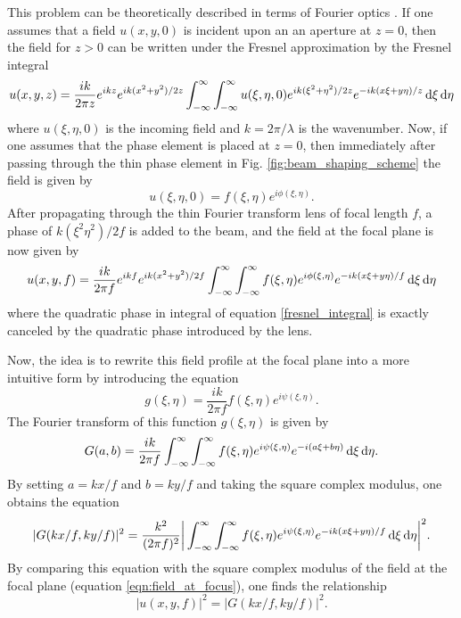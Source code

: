 This problem can be theoretically described in terms of Fourier optics \cite{dickeyLaserBeamShaping2000, romeroMathematicalAspectsLaser2010, goodmanIntroductionFourierOptics2005}.  If one assumes that a field $u(x,y,0)$ is incident upon an an aperture at $z=0$, then the field for $z>0$ can be written under the Fresnel approximation by the Fresnel integral
\begin{equation}
\label{fresnel_integral}
	u(x,y,z)=\frac{i k}{2\pi z}e^{i k z}e^{i k (x^2+y^2)/2z}\int_{-\infty}^{\infty}\int_{-\infty}^{\infty}u(\xi,\eta,0) e^{ik(\xi^{2}+\eta^{2})/2z} e^{-ik(x\xi + y\eta)/z} \mathop{}\!\mathrm{d}\xi\mathop{}\!\mathrm{d}\eta
\end{equation}
where $u(\xi,\eta,0)$ is the incoming field and $k=2\pi/\lambda$ is the wavenumber.  Now, if one assumes that the phase element is placed at $z=0$, then immediately after passing through the thin phase element in Fig. \ref{fig:beam_shaping_scheme} the field is given by
\begin{equation}
	u(\xi,\eta,0)=f(\xi,\eta)e^{i\phi(\xi,\eta)}.
\end{equation} 
After propagating through the thin Fourier transform lens of focal length $f$, a phase of $k(\xi^2\eta^2)/2f$ is added to the beam, and the field at the focal plane is now given by
\begin{equation}
\label{eqn:field_at_focus}
	u(x,y,f)=\frac{ik}{2\pi f}e^{ikf}e^{ik(x^2+y^2)/2f}\int_{-\infty}^{\infty}\int_{-\infty}^{\infty}f(\xi,\eta)e^{i\phi(\xi,\eta)}
	e^{-ik(x\xi + y\eta)/f}\mathop{}\!\mathrm{d}\xi\mathop{}\!\mathrm{d}\eta
\end{equation}
where the quadratic phase in integral of equation \ref{fresnel_integral} is exactly canceled by the quadratic phase introduced by the lens.

Now, the idea is to rewrite this field profile at the focal plane into a more intuitive form by introducing the equation
\begin{equation}
	g(\xi,\eta)=\frac{ik}{2\pi f}f(\xi,\eta)e^{i\psi(\xi,\eta)}.
\end{equation}
The Fourier transform of this function $g(\xi,\eta)$ is given by
\begin{equation}
\label{eqn:big_G}
	G(a,b)=\frac{ik}{2\pi f}\int_{-\infty}^{\infty}\int_{-\infty}^{\infty}f(\xi,\eta)e^{i\psi(\xi,\eta)}
	e^{-i(a\xi + b\eta)}\mathop{}\!\mathrm{d}\xi\mathop{}\!\mathrm{d}\eta.
\end{equation}
By setting $a=kx/f$ and $b=ky/f$ and taking the square complex modulus, one obtains the equation
\begin{equation}
	\rvert G(kx/f,ky/f)\rvert^{2} = \frac{k^2}{(2\pi f)^2} \bigg\rvert\int_{-\infty}^{\infty}\int_{-\infty}^{\infty}
	f(\xi,\eta)e^{i\psi(\xi,\eta)}e^{-ik(x\xi+y\eta)/f}\mathop{}\!\mathrm{d}\xi\mathop{}\!\mathrm{d}\eta\bigg\rvert^{2}.
\end{equation}
By comparing this equation with the square complex modulus of the field at the focal plane (equation \ref{eqn:field_at_focus}), one finds the relationship
\begin{equation}
\label{eqn:Fourier_focal_plane}
	\rvert u(x,y,f)\rvert^2 = \rvert G(kx/f,ky/f)\rvert^2.
\end{equation}

